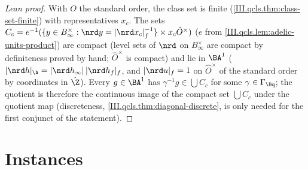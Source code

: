 \begin{proof}[Lean proof]
With $O$ the standard order, the class set is finite (\cref{III.qcls.thm:class-set-finite}) with representatives $x_c$. The sets $C_c=e^{-1}(\{y\in B_\infty^\times:\nrd y=|\nrd x_c|_f^{-1}\}\times x_c\hat O^\times)$ ($e$ from \cref{III.qcls.lem:adelic-units-product}) are compact (level sets of $\nrd$ on $B_\infty^\times$ are compact by definiteness proved by hand; $\hat O^\times$ is compact) and lie in $\BA^1$ ($|\nrd h|_\A=|\nrd h_\infty|\,|\nrd h_f|_f$, and $|\nrd u|_f=1$ on $\hat O^\times$ of the standard order by coordinates in $\hat{\Z}$). Every $g\in\BA^1$ has $\gamma^{-1}g\in\bigcup C_c$ for some $\gamma\in\Gamma_{\Bq}$; the quotient is therefore the continuous image of the compact set $\bigcup C_c$ under the quotient map (discreteness, \cref{III.qcls.thm:diagonal-discrete}, is only needed for the first conjunct of the statement).
\end{proof}


\section{Instances}\label{sec:qcls-instances}


